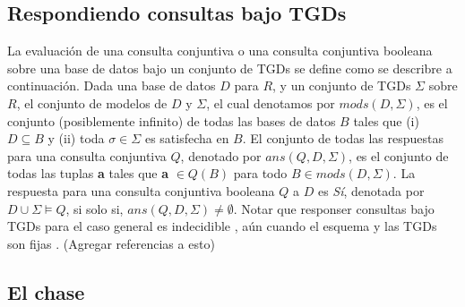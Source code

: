 \documentclass[11pt,a4paper,twoside]{tesis}
\theoremstyle{definition}
\begin{document}
\subsection{Respondiendo consultas bajo TGDs}

La evaluación de una consulta conjuntiva o una consulta conjuntiva booleana sobre una base de datos bajo un conjunto de TGDs se define como se describre a continuación. Dada una base de datos $D$ para $R$, y un conjunto de TGDs $\Sigma$ sobre $R$, el conjunto de modelos de $D$ y $\Sigma$, el cual denotamos por $mods(D,\Sigma)$, es el conjunto (posiblemente infinito) de todas las bases de datos $B$ tales que (i) $D \subseteq B$ y (ii) toda $\sigma \in \Sigma$ es satisfecha en $B$. El conjunto de todas las respuestas para una consulta conjuntiva $Q$, denotado por $ans(Q, D, \Sigma)$, es el conjunto de todas las tuplas \textbf{a} tales que \textbf{a} $\in Q(B)$ para todo $B \in mods(D, \Sigma)$. La respuesta para una consulta conjuntiva booleana $Q$ a $D$ es \textit{Sí}, denotada por $D \cup \Sigma \models Q$, si solo si, $ans(Q, D, \Sigma) \neq \emptyset$. Notar que responser consultas bajo TGDs para el caso general es indecidible \cite{beeri}, aún cuando el esquema y las TGDs son fijas \cite{cali}. (Agregar referencias a esto)

\subsection{El chase}
\end{document}
